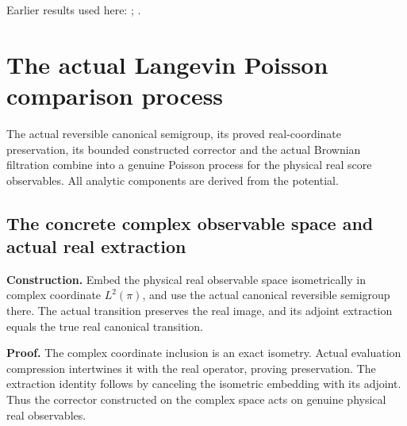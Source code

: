 \documentclass[11pt,a4paper]{report}
\begin{document}
Earlier results used here: \cite[Section~3.13.3]{LangevinLean2026ULASC}; \cite[Section~3.26.3]{LangevinLean2026ULASC}.
\section{\texorpdfstring{The actual Langevin Poisson comparison process}{The actual Langevin Poisson comparison process}}
\label{proof-module-WassersteinMixing-ActualPoisson-lean}


The actual reversible canonical semigroup, its proved real-coordinate preservation, its bounded constructed corrector and the actual Brownian filtration combine into a genuine Poisson process for the physical real score observables. All analytic components are derived from the potential.

\subsection{\texorpdfstring{The concrete complex observable space and actual real extraction}{The concrete complex observable space and actual real extraction}}
\label{report-step-WassersteinMixing-ActualPoisson-lean-1}


\textbf{Construction.} Embed the physical real observable space isometrically in complex coordinate \(L^2(\pi)\), and use the actual canonical reversible semigroup there. The actual transition preserves the real image, and its adjoint extraction equals the true real canonical transition.



\textbf{Proof.} The complex coordinate inclusion is an exact isometry. Actual evaluation compression intertwines it with the real operator, proving preservation. The extraction identity follows by canceling the isometric embedding with its adjoint. Thus the corrector constructed on the complex space acts on genuine physical real observables.
\end{document}
